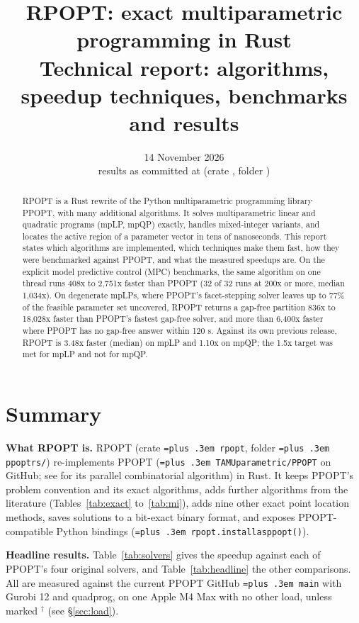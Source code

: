 \documentclass[10pt,a4paper]{article}
\title{\textbf{RPOPT: exact multiparametric programming in Rust}\\[3pt]
\large Technical report: algorithms, speedup techniques, benchmarks and results}
\author{}
\date{14 November 2026 \\ results as committed at \code{201d8a5} (crate \code{rpopt}, folder \code{ppopt\_rs/})}
\newcommand{\busy}{$^\dagger$}
\newcommand{\rpopt}{RPOPT}
\newcommand{\ppopt}{PPOPT}
\newcommand{\code}[1]{{\let\_\bu\texttt{\spaceskip=\fontdimen2\font plus .3em #1}}}
\newcommand{\bu}{\textunderscore\hspace{0pt}}
\begin{document}
\maketitle
\vspace{-2.2em}

\begin{abstract}\noindent
\rpopt{} is a Rust rewrite of the Python multiparametric programming library \ppopt{}, with many additional
algorithms. It solves multiparametric linear and quadratic programs (mpLP, mpQP) exactly, handles mixed-integer
variants, and locates the active region of a parameter vector in tens of nanoseconds. This report states which
algorithms are implemented, which techniques make them fast, how they were benchmarked against \ppopt{}, and what
the measured speedups are. On the explicit model predictive control (MPC) benchmarks, the same algorithm on one thread
runs 408x to 2,751x faster than \ppopt{} (32 of 32 runs at 200x or more, median 1,034x). On degenerate mpLPs, where
\ppopt{}'s facet-stepping solver leaves up to 77\% of the feasible parameter set uncovered, \rpopt{} returns a gap-free
partition 836x to 18,028x faster than \ppopt{}'s fastest gap-free solver, and more than 6,400x faster where \ppopt{}
has no gap-free answer within 120 s. Against its own previous release, \rpopt{} is 3.48x faster (median) on
mpLP and 1.10x on mpQP; the 1.5x target was met for mpLP and not for mpQP.
\end{abstract}


\section{Summary}

\textbf{What \rpopt{} is.} \rpopt{} (crate \code{rpopt}, folder \code{ppopt\_rs/}) re-implements \ppopt{}
(\code{TAMUparametric/PPOPT} on GitHub; see \cite{kenefake2024parallel} for its parallel combinatorial algorithm) in Rust. It keeps \ppopt{}'s problem convention and its exact algorithms,
adds further algorithms from the literature (Tables~\ref{tab:exact} to~\ref{tab:mi}), adds nine other exact point location methods, saves solutions to a bit-exact
binary format, and exposes \ppopt{}-compatible Python bindings (\code{rpopt.install\_as\_ppopt()}).

\textbf{Headline results.} Table~\ref{tab:solvers} gives the speedup against each of \ppopt{}'s four original solvers,
and Table~\ref{tab:headline} the other comparisons. All are measured against the current \ppopt{} GitHub \code{main}
with Gurobi 12 and quadprog, on one Apple M4 Max with no other load, unless marked \busy{} (see \S\ref{sec:load}).
\end{document}
